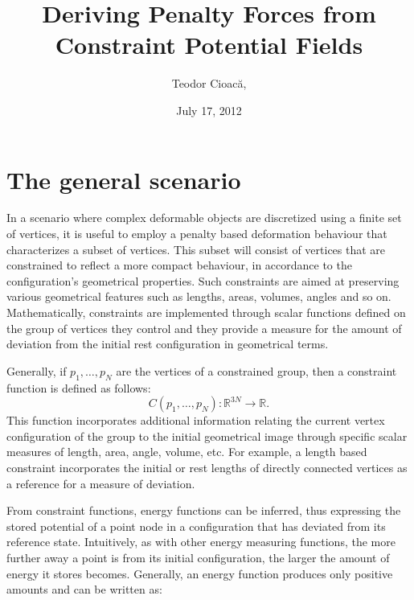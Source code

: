 \documentclass[12pt]{article}
\title{Deriving Penalty Forces from Constraint Potential Fields}
\author{Teodor Cioac\u a, }		%
\date{July 17, 2012}					%
\begin{document}
\maketitle						%

\section{The general scenario}
In a scenario where complex deformable objects are discretized using a finite set of vertices, it is useful to 
employ a penalty based deformation behaviour that characterizes a subset of vertices. This subset will consist of
vertices that are constrained to reflect a more compact behaviour, in accordance to the configuration's geometrical
properties. Such constraints are aimed at preserving various geometrical features such as lengths, areas, volumes,
angles and so on. Mathematically, constraints are implemented through scalar functions defined on the group of vertices
they control and they provide a measure for the amount of deviation from the initial rest configuration in geometrical terms.

Generally, if $p_1, \ldots, p_N$ are the vertices of a constrained group, then a constraint function is defined as follows:
\begin{equation}
\label{constraint_function}
C(p_1, \ldots, p_N): \mathbb{R}^{3N} \to \mathbb{R}.
\end{equation}
This function incorporates additional information relating the current vertex configuration of the group to the initial 
geometrical image through specific scalar measures of length, area, angle, volume, etc. For example, a length based constraint
incorporates the initial or rest lengths of directly connected vertices as a reference for a measure of deviation. 

\vspace{21pt}

From constraint functions, energy functions can be inferred, thus expressing the stored potential of a point node in a configuration
that has deviated from its reference state. Intuitively, as with other energy measuring functions, the more further away a point is from its
initial configuration, the larger the amount of energy it stores becomes. Generally, an energy function produces only positive amounts and can be written as:
\end{document}
